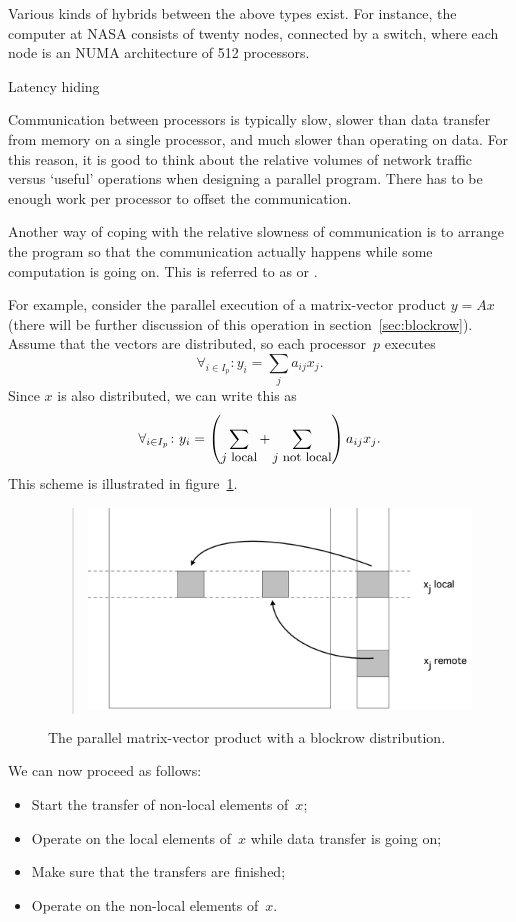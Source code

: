 Various kinds of hybrids between the above types exist. For instance,
the  computer at NASA consists of twenty nodes,
connected by a switch, where each node is an NUMA architecture of 512
processors.

 {Latency hiding}
\label{sec:comcom-overlap}

Communication between processors is typically slow, slower than data
transfer from memory on a single processor, and much slower than
operating on data. For this reason, it is good to think about the
relative volumes of network traffic versus `useful' operations when
designing a parallel program. There has to be enough work per
processor to offset the communication.

Another way of coping with the relative slowness of
communication is to arrange the program so that the communication
actually happens while some computation is going on. This is referred
to as  or
.

For example, consider the parallel execution of a matrix-vector
product $y=Ax$ (there will be further discussion of this operation in
section~\ref{sec:blockrow}). Assume that the vectors are distributed,
so each processor~$p$ executes
\[ \forall_{i\in I_p}\colon y_i=\sum_j a_{ij}x_j. \]
Since $x$ is also distributed, we can write this as
\[ \forall_{i\in I_p}\colon y_i=
  \left(\sum_{\mbox{\small $j$ local}}
    +\sum_{\mbox{\small $j$ not local}} \right) a_{ij}x_j. \]
This scheme is illustrated in figure~\ref{fig:distmvp}.
\begin{figure}
  \begin{quote}
  \includegraphics[scale=.12]{graphics-public/distmvp}
  \end{quote}
  \caption{The parallel matrix-vector product with a blockrow
    distribution.}
  \label{fig:distmvp}
\end{figure}
We can now proceed as follows:
\begin{itemize}
\item Start the transfer of non-local elements of~$x$;
\item Operate on the local elements of~$x$ while data transfer is
  going on;
\item Make sure that the transfers are finished;
\item Operate on the non-local elements of~$x$.
\end{itemize}

